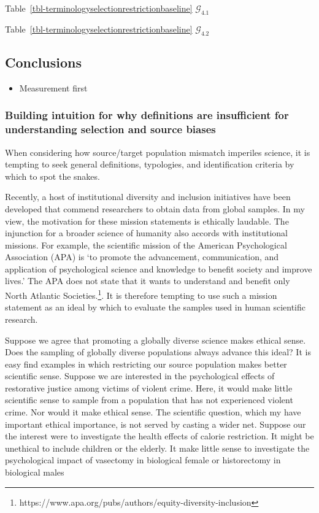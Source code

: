 \documentclass[
  single column]{article}
\providecommand{\tightlist}{%
  \setlength{\itemsep}{0pt}\setlength{\parskip}{0pt}}\usepackage{longtable,booktabs,array}
\begin{document}
Table~\ref{tbl-terminologyselectionrestrictionbaseline}
\(\mathcal{G}_{4.1}\)

Table~\ref{tbl-terminologyselectionrestrictionbaseline}
\(\mathcal{G}_{4.2}\)

\subsection{Conclusions}\label{conclusions}

\begin{itemize}
\tightlist
\item
  Measurement first
\end{itemize}

\subsubsection{Building intuition for why definitions are insufficient
for understanding selection and source
biases}\label{building-intuition-for-why-definitions-are-insufficient-for-understanding-selection-and-source-biases}

When considering how source/target population mismatch imperiles
science, it is tempting to seek general definitions, typologies, and
identification criteria by which to spot the snakes.

Recently, a host of institutional diversity and inclusion initiatives
have been developed that commend researchers to obtain data from global
samples. In my view, the motivation for these mission statements is
ethically laudable. The injunction for a broader science of humanity
also accords with institutional missions. For example, the scientific
mission of the American Psychological Association (APA) is `to promote
the advancement, communication, and application of psychological science
and knowledge to benefit society and improve lives.' The APA does not
state that it wants to understand and benefit only North Atlantic
Societies.\footnote{https://www.apa.org/pubs/authors/equity-diversity-inclusion}.
It is therefore tempting to use such a mission statement as an ideal by
which to evaluate the samples used in human scientific research.

Suppose we agree that promoting a globally diverse science makes ethical
sense. Does the sampling of globally diverse populations always advance
this ideal? It is easy find examples in which restricting our source
population makes better scientific sense. Suppose we are interested in
the psychological effects of restorative justice among victims of
violent crime. Here, it would make little scientific sense to sample
from a population that has not experienced violent crime. Nor would it
make ethical sense. The scientific question, which my have important
ethical importance, is not served by casting a wider net. Suppose our
the interest were to investigate the health effects of calorie
restriction. It might be unethical to include children or the elderly.
It make little sense to investigate the psychological impact of
vasectomy in biological female or historectomy in biological males
\end{document}
